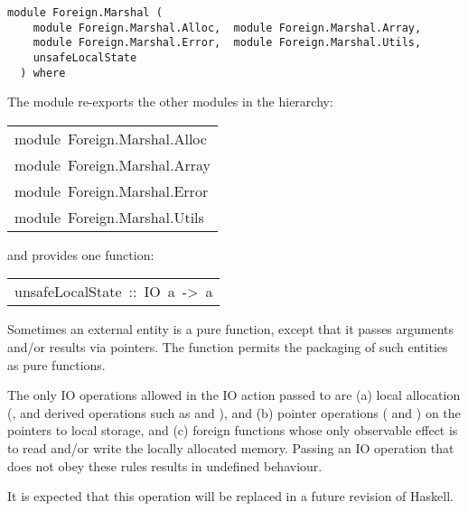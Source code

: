 \label{module:Foreign.Marshal}
\haddockbeginheader
{\haddockverb\begin{verbatim}
module Foreign.Marshal (
    module Foreign.Marshal.Alloc,  module Foreign.Marshal.Array, 
    module Foreign.Marshal.Error,  module Foreign.Marshal.Utils, 
    unsafeLocalState
  ) where\end{verbatim}}
\haddockendheader

The module  re-exports the other modules in the
  hierarchy:
\par

\begin{haddockdesc}
\item[\begin{tabular}{@{}l}
module\ Foreign.Marshal.Alloc\\module\ Foreign.Marshal.Array\\module\ Foreign.Marshal.Error\\module\ Foreign.Marshal.Utils
\end{tabular}]
\end{haddockdesc}
and provides one function:
\par

\begin{haddockdesc}
\item[\begin{tabular}{@{}l}
unsafeLocalState\ ::\ IO\ a\ ->\ a
\end{tabular}]\haddockbegindoc
Sometimes an external entity is a pure function, except that it passes
arguments and/or results via pointers.  The function
 permits the packaging of such entities as pure
functions.  
\par
The only IO operations allowed in the IO action passed to
 are (a) local allocation (, 
and derived operations such as  and ), and (b)
pointer operations ( and ) on the
pointers to local storage, and (c) foreign functions whose only
observable effect is to read and/or write the locally allocated
memory.  Passing an IO operation that does not obey these rules
results in undefined behaviour.
\par
It is expected that this operation will be
replaced in a future revision of Haskell.
\par

\end{haddockdesc}